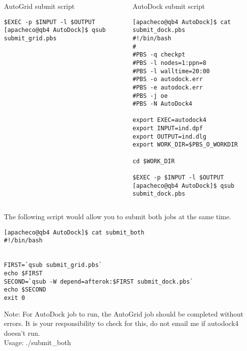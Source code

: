 \documentclass[slidestop,mathserif,compress,xcolor=svgnames]{beamer}
\newenvironment{eblock}[0]
{
\begin{beamerboxesrounded}[upper=uppercol2,lower=lowercol2,shadow=true]}
{\end{beamerboxesrounded}}
\begin{document}
\begin{frame}
\begin{columns}
\begin{eblock}{AutoGrid submit script}
{\begin{verbatim}
$EXEC -p $INPUT -l $OUTPUT 
[apacheco@qb4 AutoDock]$ qsub submit_grid.pbs
      \end{verbatim}
      }
    \end{eblock}
    \column{5.6cm}
    \begin{eblock}{AutoDock submit script}
      {\tiny
      \begin{verbatim}
[apacheco@qb4 AutoDock]$ cat submit_dock.pbs 
#!/bin/bash
#
#PBS -q checkpt 
#PBS -l nodes=1:ppn=8
#PBS -l walltime=20:00
#PBS -o autodock.err
#PBS -e autodock.err
#PBS -j oe
#PBS -N AutoDock4

export EXEC=autodock4
export INPUT=ind.dpf
export OUTPUT=ind.dlg
export WORK_DIR=$PBS_O_WORKDIR

cd $WORK_DIR

$EXEC -p $INPUT -l $OUTPUT  
[apacheco@qb4 AutoDock]$ qsub submit_dock.pbs
      \end{verbatim}
      }
    \end{eblock}
  \end{columns}

  \begin{eblock}{}
    The following script would allow you to submit both jobs at the same time.
    {\tiny
    \begin{verbatim}
[apacheco@qb4 AutoDock]$ cat submit_both
#!/bin/bash


FIRST=`qsub submit_grid.pbs`
echo $FIRST
SECOND=`qsub -W depend=afterok:$FIRST submit_dock.pbs`
echo $SECOND
exit 0
    \end{verbatim}
    }
    Note: For AutoDock job to run, the AutoGrid job should be completed without errors. It is your responsibility to check for this, do not email me if autodock4 doesn't run.\\
    Usage: ./submit\_both
  \end{eblock}
\end{frame}
\end{document}
